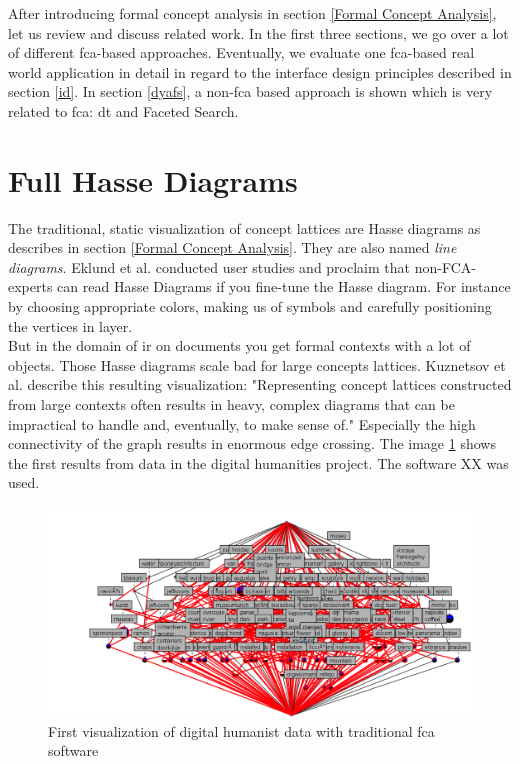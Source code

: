 \documentclass[11pt]{report}
\begin{document}
{{After introducing formal concept analysis in section \ref{Formal Concept Analysis}, let us review and discuss related work. In the first three sections, we go over a lot of different \acrshort{fca}-based approaches. Eventually, we evaluate one \acrshort{fca}-based real world application in detail in regard to the interface design principles described in section \ref{id}. In section \ref{dyafs}, a non-\acrshort{fca} based approach is shown which is very related to \acrshort{fca}: \acrshort{dt} and Faceted Search. \\

\section{Full Hasse Diagrams}

The traditional, static visualization of concept lattices are Hasse diagrams as describes in section \ref{Formal Concept Analysis}. They are also named \textit{line diagrams}. Eklund et al. \cite{Eklund2004} conducted user studies and proclaim that non-FCA-experts can read Hasse Diagrams if you fine-tune the Hasse diagram. For instance by choosing appropriate colors, making us of symbols and carefully positioning the vertices in layer. \\

But in the domain of \acrshort{ir} on documents you get formal contexts with a lot of objects. Those Hasse diagrams scale bad for large concepts lattices. Kuznetsov et al. \cite{Kuznetsov20072}  describe this resulting visualization: "Representing concept lattices constructed from large contexts often results in heavy, complex diagrams that can be impractical to handle and, eventually, to make sense of." Especially the high connectivity of the graph results in enormous edge crossing. The image \ref{figure:firstVisualizaion} shows the first results from data in the digital humanities project. The software XX was used. \\

\begin{figure}[!ht]
	\centering
	\includegraphics[width=\linewidth]{./images/firstVisualization}
\caption{First visualization of digital humanist data with traditional \acrshort{fca} software}
\label{figure:firstVisualizaion}
\end{figure}

}}
\end{document}
